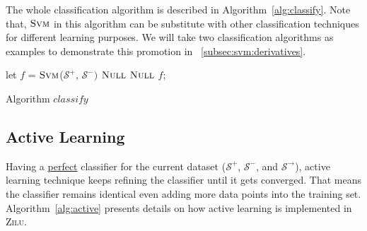 The whole classification algorithm is described in Algorithm~\ref{alg:classify}. 
Note that,
$\textsc{Svm}$ in this algorithm can be substitute with other classification techniques for different learning purposes. 
We will take two classification algorithms as examples to demonstrate this promotion in ~\ref{subsec:svm:derivatives}.
\begin{algorithm}[!h]
\SetAlgoVlined
\Indm
{}
\Indp
    let $f$ = $\textsc{Svm}$($\mathcal{S}^+$, $\mathcal{S}^-)$\;
     {
        \Return $\textsc{Null}$\;
    }
     {
        \Return $\textsc{Null}$\;
    }
    \Return $f$;
\caption{Algorithm $classify$}
\label{alg:classify}
\end{algorithm}


 



\subsection{Active Learning} 
\label{subsec:active:learning}
Having a \underline{perfect} classifier for the current dataset ($\mathcal{S}^+$, $\mathcal{S}^-$, and $\mathcal{S}^\rightarrow$), 
active learning technique keeps refining the classifier until it gets converged.
That means the classifier remains identical even adding more data points into the training set. 
Algorithm~\ref{alg:active} presents details on how active learning is implemented in \textsc{Zilu}. 

